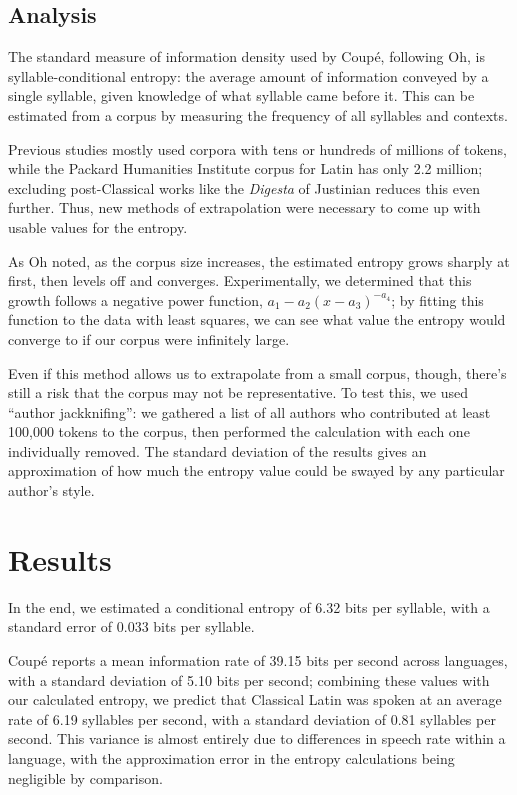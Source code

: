 \documentclass{article}
\begin{document}
\subsection{Analysis}

The standard measure of information density used by Coupé, following Oh, is syllable-conditional entropy: the average amount of information conveyed by a single syllable, given knowledge of what syllable came before it. This can be estimated from a corpus by measuring the frequency of all syllables and contexts.

Previous studies mostly used corpora with tens or hundreds of millions of tokens, while the Packard Humanities Institute corpus for Latin has only 2.2 million; excluding post-Classical works like the \emph{Digesta} of Justinian reduces this even further. Thus, new methods of extrapolation were necessary to come up with usable values for the entropy.

As Oh noted, as the corpus size increases, the estimated entropy grows sharply at first, then levels off and converges. Experimentally, we determined that this growth follows a negative power function, \( a_1 - a_2 (x - a_3)^{-a_4} \); by fitting this function to the data with least squares, we can see what value the entropy would converge to if our corpus were infinitely large.


Even if this method allows us to extrapolate from a small corpus, though, there's still a risk that the corpus may not be representative. To test this, we used ``author jackknifing'': we gathered a list of all authors who contributed at least 100,000 tokens to the corpus, then performed the calculation with each one individually removed. The standard deviation of the results gives an approximation of how much the entropy value could be swayed by any particular author's style.

\section{Results}

In the end, we estimated a conditional entropy of 6.32 bits per syllable, with a standard error of 0.033 bits per syllable.

Coupé reports a mean information rate of 39.15 bits per second across languages, with a standard deviation of 5.10 bits per second; combining these values with our calculated entropy, we predict that Classical Latin was spoken at an average rate of 6.19 syllables per second, with a standard deviation of 0.81 syllables per second. This variance is almost entirely due to differences in speech rate within a language, with the approximation error in the entropy calculations being negligible by comparison.
\end{document}
